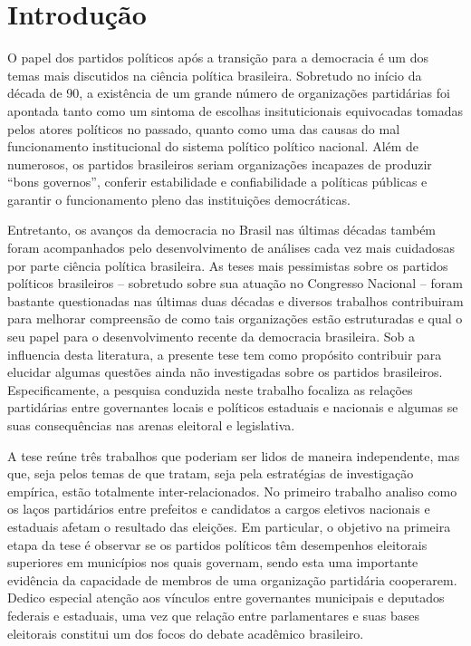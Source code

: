 \chapter*{Introdução}
\label{cap:introducao}

O papel dos partidos políticos após a transição para a democracia é um dos temas mais discutidos na ciência política brasileira. Sobretudo no início da década de 90, a existência de um grande número de organizações partidárias foi apontada tanto como um sintoma de escolhas insituticionais equivocadas tomadas pelos atores políticos no passado, quanto como uma das causas do mal funcionamento institucional do sistema político político nacional. Além de numerosos, os partidos brasileiros seriam organizações incapazes de produzir ``bons governos'', conferir estabilidade e confiabilidade a políticas públicas e garantir o funcionamento pleno das instituições democráticas.

Entretanto, os avanços da democracia no Brasil nas últimas décadas também foram acompanhados pelo desenvolvimento de análises cada vez mais cuidadosas por parte ciência política brasileira. As teses mais pessimistas sobre os partidos políticos brasileiros -- sobretudo sobre sua atuação no Congresso Nacional -- foram bastante questionadas nas últimas duas décadas e diversos trabalhos contribuiram para melhorar compreensão de como tais organizações estão estruturadas e qual o seu papel para o desenvolvimento recente da democracia brasileira. Sob a influencia desta literatura, a presente tese tem como propósito contribuir para elucidar algumas questões ainda não investigadas sobre os partidos brasileiros. Especificamente, a pesquisa conduzida neste trabalho focaliza as relações partidárias entre governantes locais e políticos estaduais e nacionais e algumas se suas consequências nas arenas eleitoral e legislativa.

A tese reúne três trabalhos que poderiam ser lidos de maneira independente, mas que, seja pelos temas de que tratam, seja pela estratégias de investigação empírica, estão totalmente inter-relacionados. No primeiro trabalho analiso como os laços partidários entre prefeitos e candidatos a cargos eletivos nacionais e estaduais afetam o resultado das eleições. Em particular, o objetivo na primeira etapa da tese é observar se os partidos políticos têm desempenhos eleitorais superiores em municípios nos quais governam, sendo esta uma importante evidência da capacidade de membros de uma organização partidária cooperarem. Dedico especial atenção aos vínculos entre governantes municipais e deputados federais e estaduais, uma vez que relação entre parlamentares e suas bases eleitorais constitui um dos focos do debate acadêmico brasileiro.

